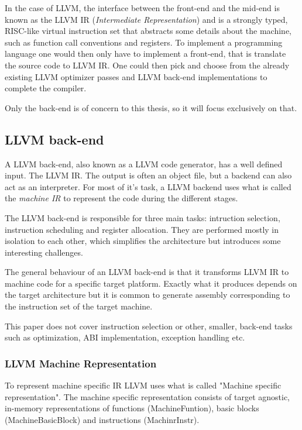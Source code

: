In the case of LLVM, the interface between the front-end and the mid-end is known as the
LLVM IR (\textit{Intermediate Representation}) and is a strongly typed, RISC-like virtual
instruction set that abstracts some details about the machine, such as function call
conventions and registers. To implement a programming language one would then only have to
implement a front-end, that is translate the source code to LLVM IR. One could then pick
and choose from the already existing LLVM optimizer passes and LLVM back-end implementations
to complete the compiler.

Only the back-end is of concern to this thesis, so it will focus exclusively on that.

\subsection{LLVM back-end}

A LLVM back-end, also known as a LLVM code generator, has a well defined input. The
LLVM IR. The output is often an object file, but a backend can also act as an interpreter.
For most of it's task, a LLVM backend uses what is called the \textit{machine IR} to represent
the code during the different stages.

The LLVM back-end is responsible for three main tasks: intruction selection, instruction
scheduling and register allocation. They are performed mostly in isolation to each
other, which simplifies the architecture but introduces some interesting challenges.

The general behaviour of an LLVM back-end is that it transforms LLVM IR to machine code
for a specific target platform. Exactly what it produces depends on the target architecture
but it is common to generate assembly corresponding to the instruction set of the target
machine.

This paper does not cover instruction selection or other, smaller, back-end tasks such as
optimization, ABI implementation, exception handling etc.

\subsubsection{LLVM Machine Representation}

To represent machine specific IR LLVM uses what is called "Machine specific representation".
The machine specific representation consists of target agnostic, in-memory representations
of functions (MachineFuntion), basic blocks (MachineBasicBlock) and instructions (MachinrInstr).

